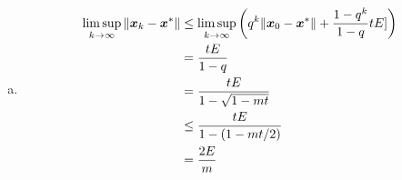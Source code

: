 \documentclass{article}
\def\bx{\boldsymbol{x}}
\begin{document}
\begin{enumerate}[(a)]
	\item
		$$
		\begin{aligned}
			\mathop{\lim\sup}_{k\to\infty}\norm{\bx_k-\bx^*}
			&\le
			\mathop{\lim\sup}_{k\to\infty}
			\qty(q^k\norm{\bx_0-\bx^*}+\dfrac{1-q^k}{1-q}tE])
			\\
			&=\frac{tE}{1-q}
			\\
			&=
			\frac{tE}{1-\sqrt{1-mt}}
			\\&\le
			\frac{tE}{1-\qty(1-mt/2)}
			\\
			&=
			\frac{2E}{m}
		\end{aligned}
		$$
\end{enumerate}
\end{document}
